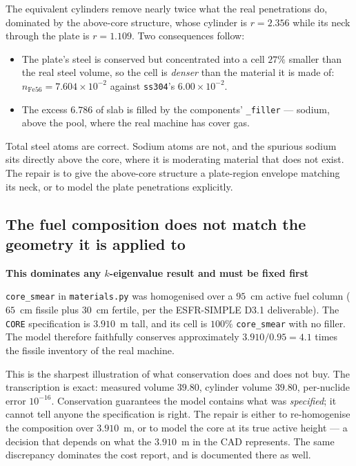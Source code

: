 \documentclass[9pt,a4paper]{extarticle}
\newcommand{\code}[1]{\texttt{\small #1}}
\newcommand{\file}[1]{\texttt{\small #1}}
\newenvironment{caveat}[1]%
  {\par\medskip\noindent
   \begin{lrbox}{\caveatbox}%
   \begin{minipage}{\dimexpr\linewidth-2\fboxsep-2\fboxrule\relax}%
   \textbf{#1}\par\medskip}%
  {\end{minipage}%
   \end{lrbox}%
   \fcolorbox{warnrule}{warnbg}{\usebox{\caveatbox}}\par\medskip}
\begin{document}
\noindent
The equivalent cylinders remove nearly twice what the real penetrations do,
dominated by the above-core structure, whose cylinder is $r=2.356$ while its
neck through the plate is $r=1.109$. Two consequences follow:

\begin{itemize}
  \item The plate's steel is conserved but concentrated into a cell $27\%$
    smaller than the real steel volume, so the cell is \emph{denser} than the
    material it is made of: $n_{\mathrm{Fe56}}=7.604\times10^{-2}$ against
    \code{ss304}'s $6.00\times10^{-2}$.
  \item The excess $6.786$ of slab is filled by the components'
    \code{\_filler} --- sodium, above the pool, where the real machine has cover
    gas.
\end{itemize}

\noindent
Total steel atoms are correct. Sodium atoms are not, and the spurious sodium
sits directly above the core, where it is moderating material that does not
exist. The repair is to give the above-core structure a plate-region envelope
matching its neck, or to model the plate penetrations explicitly.

\subsection{The fuel composition does not match the geometry it is applied to}

\begin{caveat}{This dominates any $k$-eigenvalue result and must be fixed first}
\code{core\_smear} in \file{materials.py} was homogenised over a $95$~cm active
fuel column ($65$~cm fissile plus $30$~cm fertile, per the ESFR-SIMPLE D3.1
deliverable). The \code{CORE} specification is $3.910$~m tall, and its cell is
$100\%$ \code{core\_smear} with no filler. The model therefore faithfully
conserves approximately $3.910/0.95 = 4.1$ times the fissile inventory of the
real machine.
\end{caveat}

\noindent
This is the sharpest illustration of what conservation does and does not buy.
The transcription is exact: measured volume $39.80$, cylinder volume $39.80$,
per-nuclide error $10^{-16}$. Conservation guarantees the model contains what
was \emph{specified}; it cannot tell anyone the specification is right. The
repair is either to re-homogenise the composition over $3.910$~m, or to model
the core at its true active height --- a decision that depends on what the
$3.910$~m in the CAD represents. The same discrepancy dominates the cost
report, and is documented there as well.
\end{document}

